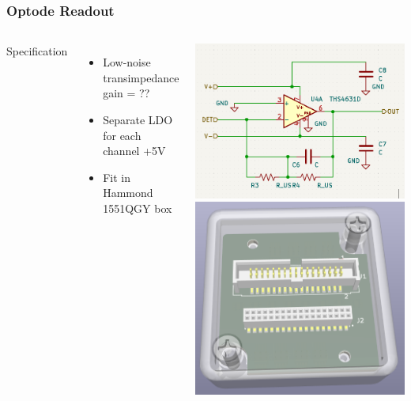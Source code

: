 \documentclass{beamer}
\begin{document}
\begin{frame}
        
\frametitle{Optode Readout}

  \begin{columns}[T]

  Specification
  \begin{itemize}
  \scriptsize
  \item Low-noise transimpedance gain = ??
  \item Separate LDO for each channel +5V
  \item Fit in Hammond 1551QGY box
  \end{itemize}


  \vskip -0.2in
  \includegraphics[width=\textwidth]{figs/schem-amp.png}
  \vskip 0.2in
  \includegraphics[width=\textwidth]{figs/3D-pre-top.png}

  \end{columns}
  
\end{frame}
\end{document}
